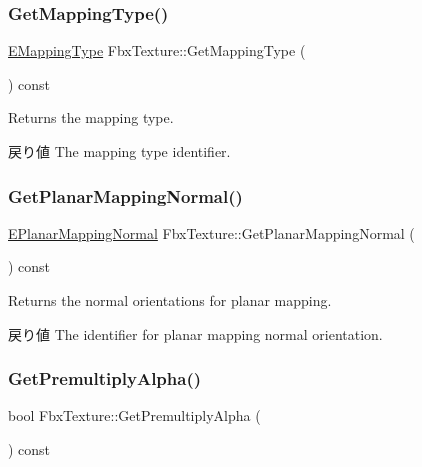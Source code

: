 \subsubsection{\texorpdfstring{Get\+Mapping\+Type()}{GetMappingType()}}
{\footnotesize\ttfamily \hyperlink{class_fbx_texture_afdf9b65a25dfe5bdcef820f0fc1f5b34}{E\+Mapping\+Type} Fbx\+Texture\+::\+Get\+Mapping\+Type (\begin{DoxyParamCaption}{ }\end{DoxyParamCaption}) const}

Returns the mapping type. \begin{DoxyReturn}{戻り値}
The mapping type identifier. 
\end{DoxyReturn}
\mbox{\label{class_fbx_texture_ad15e77afddc395d9da4ee442c769c167}} 
\subsubsection{\texorpdfstring{Get\+Planar\+Mapping\+Normal()}{GetPlanarMappingNormal()}}
{\footnotesize\ttfamily \hyperlink{class_fbx_texture_a6115b6970e4c83198112530d1e6f578c}{E\+Planar\+Mapping\+Normal} Fbx\+Texture\+::\+Get\+Planar\+Mapping\+Normal (\begin{DoxyParamCaption}{ }\end{DoxyParamCaption}) const}

Returns the normal orientations for planar mapping. \begin{DoxyReturn}{戻り値}
The identifier for planar mapping normal orientation. 
\end{DoxyReturn}
\mbox{\label{class_fbx_texture_a92ffecbc95b53e3b410a2cee81b434dc}} 
\subsubsection{\texorpdfstring{Get\+Premultiply\+Alpha()}{GetPremultiplyAlpha()}}
{\footnotesize\ttfamily bool Fbx\+Texture\+::\+Get\+Premultiply\+Alpha (\begin{DoxyParamCaption}{ }\end{DoxyParamCaption}) const}

